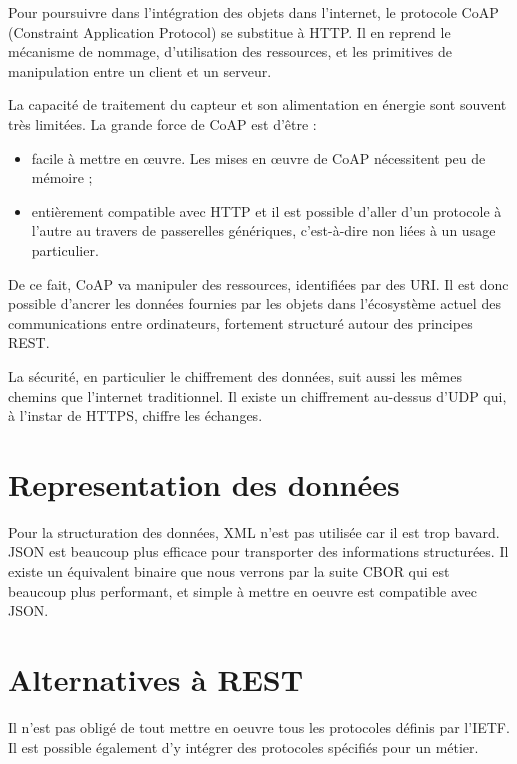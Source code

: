   Pour poursuivre dans l’intégration des objets dans l’internet, le protocole CoAP (Constraint Application Protocol)  se substitue à HTTP. Il en reprend le mécanisme de nommage, d’utilisation des ressources, et les primitives de manipulation entre un client et un serveur.

La capacité
de traitement
du capteur et son alimentation 
en énergie sont souvent très limitées. 
La grande force de CoAP est d’être :
\begin{itemize}
\item facile à mettre en œuvre. Les mises en œuvre de CoAP nécessitent peu de mémoire ;
\item entièrement compatible avec 
HTTP et il est possible d’aller d’un 
protocole
à l’autre
au travers de 
passerelles
génériques, c’est-à-dire non liées 
à un usage particulier.
\end{itemize}
De ce fait, CoAP va manipuler des ressources, identifiées par des URI. Il est donc possible d'ancrer les données fournies par les objets dans l'écosystème actuel des communications entre ordinateurs, fortement structuré autour des principes REST.

     \vspace{1em}

La sécurité, en particulier 
le chiffrement des données, 
suit aussi les mêmes chemins que l’internet traditionnel. 
Il existe un chiffrement au-dessus d’UDP qui, 
à l’instar
de HTTPS, 
chiffre les échanges.
  
\section{Representation des données}

Pour la structuration des données, XML n'est pas utilisée car il est trop bavard. JSON est beaucoup plus efficace pour transporter des informations structurées. Il existe un équivalent binaire que nous verrons par la suite CBOR qui est beaucoup plus performant, et simple à mettre en oeuvre est compatible avec JSON.

\section {Alternatives à REST}


Il n'est pas obligé de tout mettre en oeuvre tous les protocoles définis par l'IETF. Il est possible également d'y intégrer des protocoles spécifiés pour un métier. 

